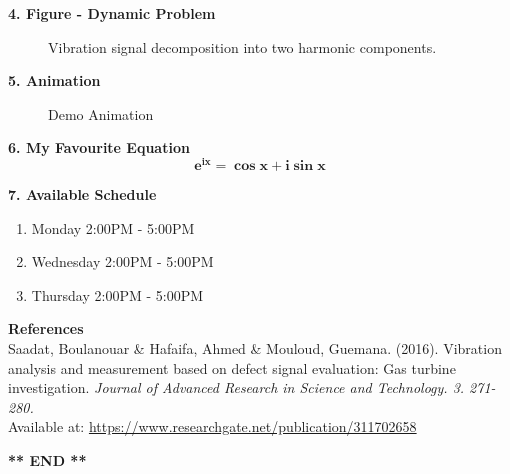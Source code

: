 \documentclass[12pt,a4paper]{article}
\begin{document}
\newpage

\textbf{4. Figure - Dynamic Problem}
\begin{figure} [!h]
  \begin{center}
    \caption{Vibration signal decomposition into two harmonic components.}
    \label{image}
  \end{center}
\end{figure}
\bigskip

\textbf{5. Animation}
\begin{figure} [!h]
  \begin{center}
    \caption{Demo Animation}
    \label{demoanimation}
  \end{center}
\end{figure}
\bigskip

\textbf{6. My Favourite Equation}
\begin{equation}
  \mathbf{e}^\mathbf{ix} = \mathbf{\cos{x}} + \mathbf{i \sin{x}}
\end{equation}
\bigskip

\textbf{7. Available Schedule}
\begin{enumerate}
  \item Monday 2:00PM - 5:00PM
  \item Wednesday 2:00PM - 5:00PM
  \item Thursday 2:00PM - 5:00PM
\end{enumerate}
\bigskip

\noindent \textbf{References}\\
\noindent [\ref{image}] Saadat, Boulanouar \& Hafaifa, Ahmed \& Mouloud, Guemana. (2016).
Vibration analysis and measurement based on defect signal evaluation: Gas turbine investigation.
\textit{Journal of Advanced Research in Science and Technology. 3. 271-280.}\\
Available at: \href{https://www.researchgate.net/publication/311702658_Vibration_analysis_and_measurement_based_on_defect_signal_evaluation_Gas_turbine_investigation}{https://www.researchgate.net/publication/311702658}
\bigskip

\begin{center}
  \textbf{** END **}
\end{center}
\end{document}
